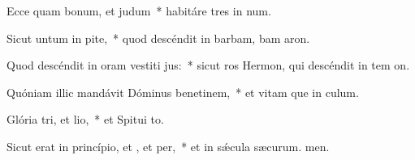 \item Ecce quam bonum, et  judum~* habitáre tres in num.
\item Sicut untum in pite,~* quod descéndit in barbam, bam aron.
\item Quod descéndit in oram vestiti jus:~* sicut ros Hermon, qui descéndit in tem on.
\item Quóniam illic mandávit Dóminus benetinem,~* et vitam que in culum.
\item Glória tri, et lio,~* et Spitui to.
\item Sicut erat in princípio, et , et per,~* et in sǽcula sæcurum. men.
